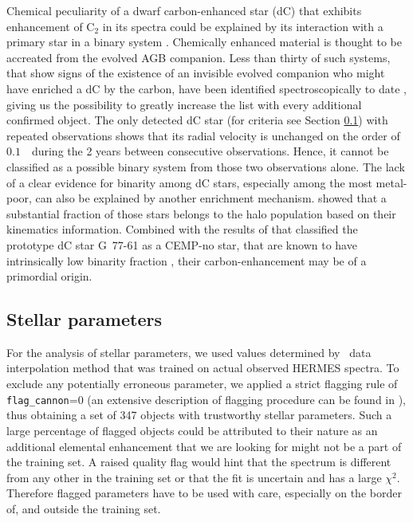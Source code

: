 Chemical peculiarity of a dwarf carbon-enhanced star (dC) that exhibits enhancement of C$_2$ in its spectra could be explained by its interaction with a primary star in a binary system \citep{2018ApJ...856L...2M}. Chemically enhanced material is thought to be accreated from the evolved AGB companion. Less than thirty of such systems, that show signs of the existence of an invisible evolved companion who might have enriched a dC by the carbon, have been identified spectroscopically to date \citep{1986ApJ...300..314D, 2018ApJ...856L...2M, 2018MNRAS.479.3873W}, giving us the possibility to greatly increase the list with every additional confirmed object. The only detected dC star (for criteria see Section \ref{sec:cannon_params}) with repeated observations shows that its radial velocity is unchanged on the order of $0.1$~\kms\ during the 2 years between consecutive observations. Hence, it cannot be classified as a possible binary system from those two observations alone. The lack of a clear evidence for binarity among dC stars, especially among the most metal-poor, can also be explained by another enrichment mechanism. \citet{2018MNRAS.477.3801F} showed that a substantial fraction of those stars belongs to the halo population based on their kinematics information. Combined with the results of \citet{2016ApJ...833...20Y} that classified the prototype dC star \mbox{G 77-61} as a CEMP-no star, that are known to have intrinsically low binarity fraction \citep{2014MNRAS.441.1217S, 2016A&A...586A.160H}, their carbon-enhancement may be of a primordial origin.

\subsection{Stellar parameters}
\label{sec:cannon_params}
For the analysis of stellar parameters, we used values determined by \TC\ data interpolation method that was trained on actual observed HERMES spectra. To exclude any potentially erroneous parameter, we applied a strict flagging rule of \texttt{flag\_cannon}=0 (an extensive description of flagging procedure can be found in \citet{buder2018}), thus obtaining a set of 347 objects with trustworthy stellar parameters. Such a large percentage of flagged objects could be attributed to their nature as an additional elemental enhancement that we are looking for might not be a part of the training set. A raised quality flag would hint that the spectrum is different from any other in the training set or that the fit is uncertain and has a large $\chi^2$. Therefore flagged parameters have to be used with care, especially on the border of, and outside the training set.

